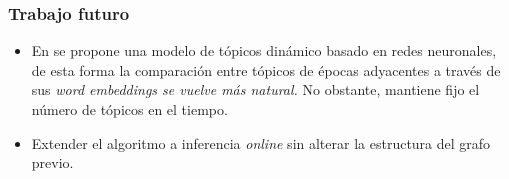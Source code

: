 \documentclass[
	spanish, %
	aspectratio=43, %
	hyperref={pdfencoding=auto,psdextra},
	xcolor={dvipsnames,table,usenames},
]{beamer}
\begin{document}
\begin{frame}
\frametitle{Trabajo futuro}

\begin{itemize}
  \item En \cite{dieng2019dynamic} se propone una modelo de tópicos dinámico basado en redes neuronales, de esta forma la comparación entre tópicos de épocas adyacentes a través de sus \textit{word embeddings se vuelve más natural.} No obstante, mantiene fijo el número de tópicos en el tiempo.
  \item Extender el algoritmo a inferencia \textit{online} sin alterar la estructura del grafo previo.
\end{itemize}

\end{frame}


\begin{frame}[allowframebreaks]\normalsize
\frametitle{\namereferences}

\end{frame}


\end{document}
